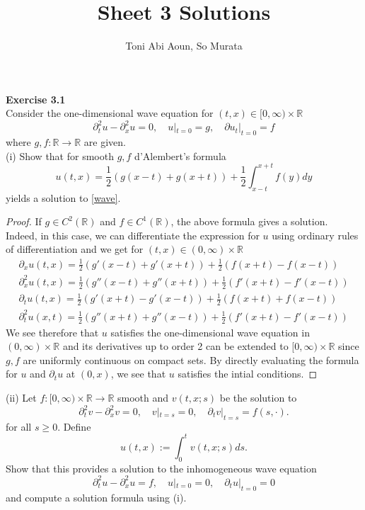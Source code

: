 \documentclass{article}
\title{Sheet 3 Solutions}
\author{Toni Abi Aoun, So Murata}
\date{}
\newcommand{\R}{\mathbb{R}}
\begin{document}
\maketitle

\textbf{Exercise 3.1}\\
Consider the one-dimensional wave equation for $(t,x)\in[0,\infty)\times\R$
\begin{equation}\label{wave}
    \partial_t^2u-\partial_x^2u=0,\quad u|_{t=0}=g,\quad \partial u_t|_{t=0}=f
\end{equation}
where $g,f:\R\to\R$ are given.\\
(i) Show that for smooth $g,f$ d'Alembert's formula
\[
u(t,x)=\frac{1}{2}(g(x-t)+g(x+t))+\frac{1}{2}\int_{x-t}^{x+t}f(y)dy
\]
yields a solution to \eqref{wave}.
\begin{proof}
    If $g\in C^2(\R)$ and $f\in C^1(\R)$, the above formula gives a solution. Indeed, in this case, we can differentiate the expression for $u$ using ordinary rules of differentiation and we get for $(t,x)\in (0,\infty)\times\R$
    \begin{gather*}
        \partial_xu(t,x)=\frac{1}{2}(g'(x-t)+g'(x+t))+\frac{1}{2}(f(x+t)-f(x-t))\\
        \partial_x^2u(t,x)=\frac{1}{2}(g''(x-t)+g''(x+t))+\frac{1}{2}(f'(x+t)-f'(x-t))\\
        \partial_tu(t,x)=\frac{1}{2}(g'(x+t)-g'(x-t))+\frac{1}{2}(f(x+t)+f(x-t))\\
        \partial_t^2u(x,t)=\frac{1}{2}(g''(x+t)+g''(x-t))+\frac{1}{2}(f'(x+t)-f'(x-t))
    \end{gather*}
    We see therefore that $u$ satisfies the one-dimensional wave equation in $(0,\infty)\times\R$ and its derivatives up to order 2 can be extended to $[0,\infty)\times\R$ since $g,f$ are uniformly continuous on compact sets. By directly evaluating the formula for $u$ and $\partial_tu$ at $(0,x)$, we see that $u$ satisfies the intial conditions.
\end{proof}
(ii) Let $f:[0,\infty)\times\R\to\R$ smooth and $v(t,x;s)$ be the solution to
\[
\partial_t^2v-\partial_x^2v=0,\quad v|_{t=s}=0,\quad\partial_tv|_{t=s}=f(s,\cdot).
\]
for all $s\geq 0$. Define
\[
u(t,x):=\int_0^tv(t,x;s)ds.
\]
Show that this provides a solution to the inhomogeneous wave equation
\begin{equation}\label{inwave}
    \partial_t^2u-\partial_x^2u=f,\quad u|_{t=0}=0,\quad \partial_tu|_{t=0}=0
\end{equation}
and compute a solution formula using (i).
\end{document}
